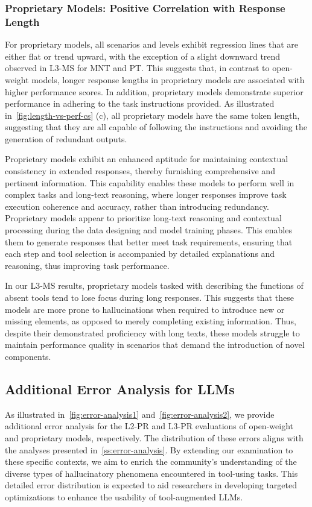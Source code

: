 \documentclass[11pt]{article}
\begin{document}
\subsubsection{Proprietary Models: Positive Correlation with Response Length}

For proprietary models, all scenarios and levels exhibit regression lines that are either flat or trend upward, with the exception of a slight downward trend observed in L3-MS for MNT and PT. 
This suggests that, in contrast to open-weight models, longer response lengths in proprietary models are associated with higher performance scores.
In addition, proprietary models demonstrate superior performance in adhering to the task instructions provided. As illustrated in~\cref{fig:length-vs-perf-cs} (c), all proprietary models have the same token length, suggesting that they are all capable of following the instructions and avoiding the generation of redundant outputs.

Proprietary models exhibit an enhanced aptitude for maintaining contextual consistency in extended responses, thereby furnishing comprehensive and pertinent information. 
This capability enables these models to perform well in complex tasks and long-text reasoning, where longer responses improve task execution coherence and accuracy, rather than introducing redundancy.
Proprietary models appear to prioritize long-text reasoning and contextual processing during the data designing and model training phases. 
This enables them to generate responses that better meet task requirements, ensuring that each step and tool selection is accompanied by detailed explanations and reasoning, thus improving task performance.

In our L3-MS results, proprietary models tasked with describing the functions of absent tools tend to lose focus during long responses.
This suggests that these models are more prone to hallucinations when required to introduce new or missing elements, as opposed to merely completing existing information. 
Thus, despite their demonstrated proficiency with long texts, these models struggle to maintain performance quality in scenarios that demand the introduction of novel components.


\subsection{Additional Error Analysis for LLMs}
\label{append:error-analysis}

As illustrated in~\cref{fig:error-analysis1} and~\cref{fig:error-analysis2}, we provide additional error analysis for the L2-PR and L3-PR evaluations of open-weight and proprietary models, respectively.
The distribution of these errors aligns with the analyses presented in~\cref{ss:error-analysis}. 
By extending our examination to these specific contexts, we aim to enrich the community's understanding of the diverse types of hallucinatory phenomena encountered in tool-using tasks. 
This detailed error distribution is expected to aid researchers in developing targeted optimizations to enhance the usability of tool-augmented LLMs.
\end{document}
